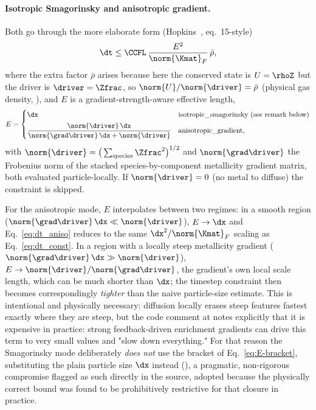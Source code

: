 \paragraph{Isotropic Smagorinsky and anisotropic gradient.}
Both go through the more elaborate form (Hopkins~\citeyear{Hopkins2017diffusion}, eq.~15-style)
\begin{equation}
  \label{eq:dt_aniso}
  \dt \le \CCFL\, \frac{E^2}{\norm{\Kmat}_F}\,\bar\rho ,
\end{equation}
where the extra factor $\bar\rho$ arises because here the conserved
state is $U=\rhoZ$ but the driver is $\driver=\Zfrac$, so
$\norm{U}/\norm{\driver} = \bar\rho$ (physical gas density,
), and $E$ is a gradient-strength-aware
effective length,
\begin{equation}
  \label{eq:E-bracket}
  E =
  \begin{cases}
    \dx & \text{isotropic\_smagorinsky (see remark below)} \\[4pt]
    \dfrac{\norm{\driver}\,\dx}{\norm{\grad\driver}\,\dx + \norm{\driver}}
      & \text{anisotropic\_gradient,}
  \end{cases}
\end{equation}
with $\norm{\driver} = \big(\sum_{\rm species} \Zfrac^2\big)^{1/2}$ and
$\norm{\grad\driver}$ the Frobenius norm of the stacked
species-by-component metallicity gradient matrix, both evaluated
particle-locally. If $\norm{\driver}=0$ (no metal to diffuse) the
constraint is skipped.

For the anisotropic mode, $E$ interpolates between two regimes: in a
smooth region ($\norm{\grad\driver}\,\dx \ll \norm{\driver}$),
$E \to \dx$ and Eq.~\eqref{eq:dt_aniso} reduces to the same
$\dx^2/\norm{\Kmat}_F$ scaling as Eq.~\eqref{eq:dt_const}. In a region
with a locally steep metallicity gradient
($\norm{\grad\driver}\,\dx \gg \norm{\driver}$),
$E \to \norm{\driver}/\norm{\grad\driver}$, the gradient's own local
scale length, which can be much shorter than $\dx$; the timestep
constraint then becomes correspondingly \emph{tighter} than the naive
particle-size estimate. This is intentional and physically necessary:
diffusion locally erases steep features fastest exactly where they are
steep, but the code comment at 
notes explicitly that it is expensive in practice: strong feedback-driven
enrichment gradients can drive this term to very small values and
"slow down everything." For that reason the Smagorinsky mode
deliberately \emph{does not} use the bracket of
Eq.~\eqref{eq:E-bracket}, substituting the plain particle size $\dx$
instead (), a pragmatic,
non-rigorous compromise flagged as such directly in the source, adopted
because the physically correct bound was found to be prohibitively
restrictive for that closure in practice.

